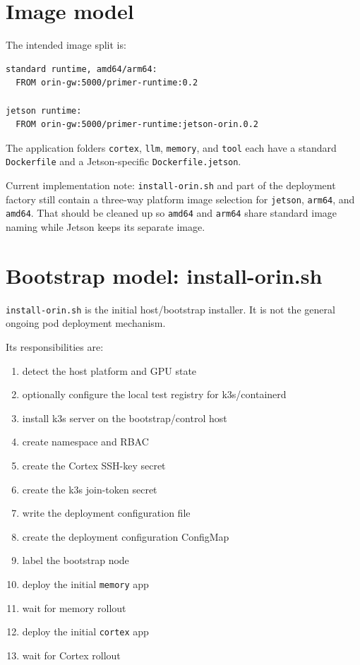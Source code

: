 \documentclass[11pt,a4paper]{article}
\begin{document}
\section{Image model}
The intended image split is:
\begin{lstlisting}
standard runtime, amd64/arm64:
  FROM orin-gw:5000/primer-runtime:0.2

jetson runtime:
  FROM orin-gw:5000/primer-runtime:jetson-orin.0.2
\end{lstlisting}

The application folders \texttt{cortex}, \texttt{llm}, \texttt{memory}, and \texttt{tool} each have a standard \texttt{Dockerfile} and a Jetson-specific \texttt{Dockerfile.jetson}.

\begin{infobox}
Current implementation note: \texttt{install-orin.sh} and part of the deployment factory still contain a three-way platform image selection for \texttt{jetson}, \texttt{arm64}, and \texttt{amd64}. That should be cleaned up so \texttt{amd64} and \texttt{arm64} share standard image naming while Jetson keeps its separate image.
\end{infobox}

\section{Bootstrap model: install-orin.sh}
\texttt{install-orin.sh} is the initial host/bootstrap installer. It is not the general ongoing pod deployment mechanism.

Its responsibilities are:
\begin{enumerate}[leftmargin=1.3em]
  \item detect the host platform and GPU state
  \item optionally configure the local test registry for k3s/containerd
  \item install k3s server on the bootstrap/control host
  \item create namespace and RBAC
  \item create the Cortex SSH-key secret
  \item create the k3s join-token secret
  \item write the deployment configuration file
  \item create the deployment configuration ConfigMap
  \item label the bootstrap node
  \item deploy the initial \texttt{memory} app
  \item wait for memory rollout
  \item deploy the initial \texttt{cortex} app
  \item wait for Cortex rollout
\end{enumerate}
\end{document}
